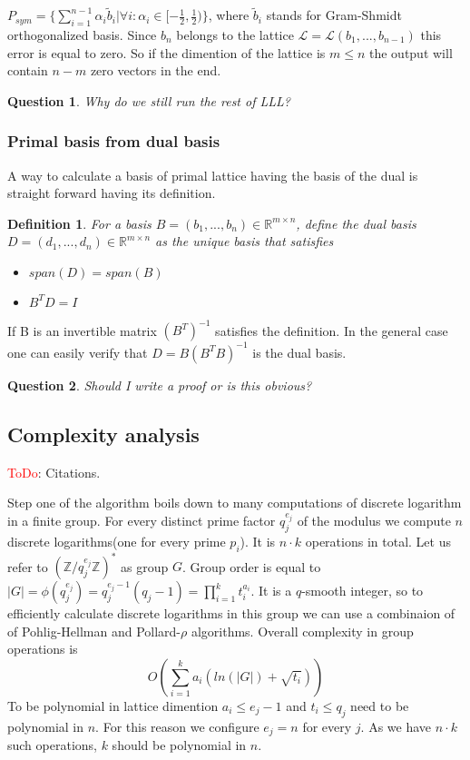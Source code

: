 \documentclass[12pt]{article}
\newcommand{\ZZ}{\mathbb{Z}}
\newcommand{\LL}{\mathcal{L}}
\newtheorem{question}{Question}
\newtheorem{definition}{Definition}
\begin{document}
$P_{sym} = \{ \sum_{i = 1}^{n-1}\alpha_{i}\tilde{b}_{i}| \forall i: \alpha_{i} \in [-\frac{1}{2}, \frac{1}{2})\}$, where $\tilde{b}_{i}$ stands for Gram-Shmidt orthogonalized basis. Since $b_{n}$ belongs to the lattice $\LL = \LL(b_{1}, ..., b_{n-1})$
this error is equal to zero. So if the dimention of the lattice is $m \leq n$ the output will contain $n-m$ zero vectors in the end.

\begin{question}
    Why do we still run the rest of LLL?
\end{question}

\subsubsection{Primal basis from dual basis}
A way to calculate a basis of primal lattice having the basis of the dual is straight forward having its definition.

\begin{definition}
    For a basis $B = (b_{1}, ..., b_{n}) \in \mathbb{R}^{m \times n}$, define the dual basis $D = (d_{1}, ..., d_{n}) \in \mathbb{R}^{m \times n}$ as the unique basis that satisfies
    \begin{itemize}
        \item $span(D) = span(B)$
        \item $B^{T}D = I$
    \end{itemize}
\end{definition}
If B is an invertible matrix $(B^{T})^{-1}$ satisfies the definition. In the general case one can easily verify that $D = B(B^{T}B)^{-1}$ is the dual basis.

\begin{question}
    Should I write a proof or is this obvious?
\end{question}

\subsection{Complexity analysis}
\textcolor{red}{ToDo}: Citations.

Step one of the algorithm boils down to many computations of discrete logarithm in a finite group. For every distinct prime factor $q_{j}^{e_{j}}$ of the modulus we compute $n$ discrete logarithms(one for every prime $p_{i}$). It is $n \cdot k$ operations in total. Let us refer to $(\ZZ/q_{j}^{e_{j}}\ZZ)^*$ as group $G$. Group order is equal to $|G| = \phi(q_{j}^{e_{j}}) =  q_{j}^{e_{j}-1}(q_{j}-1) = \prod_{i=1}^{k} t_{i}^{a_{i}}$.
It is a $q$-smooth integer, so to efficiently calculate discrete logarithms in this group we can use a combinaion of of Pohlig-Hellman and Pollard-$\rho$ algorithms. Overall complexity in group operations is
\begin{equation}
    O(\sum_{i=1}^{k} a_{i}(ln(|G|) + \sqrt{t_{i}}))
\end{equation}
To be polynomial in lattice dimention $a_{i} \leq e_{j}-1$ and $t_{i} \leq q_{j}$ need to be polynomial in $n$. For this reason we configure $e_{j} = n$ for every $j$. As we have $n \cdot k$ such operations, $k$ should be polynomial in $n$.
\end{document}
